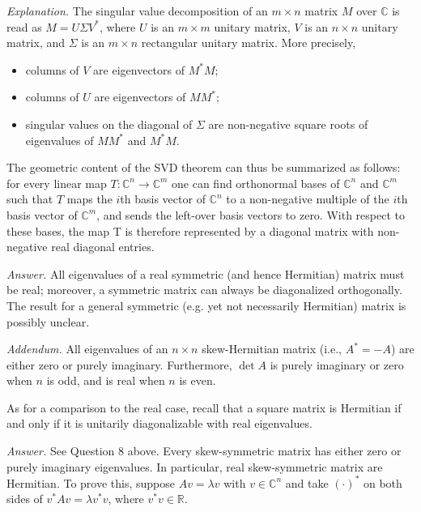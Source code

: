 \documentclass{mathproblems}
\newcommand\R{\mathbb{R}}
\newcommand\C{\mathbb{C}}
\begin{document}
\begin{questions}

\textit{Explanation.} The singular value decomposition of an $m\times n$ matrix $M$ over $\C$ is read as $M=U\Sigma V^*$, where $U$ is an $m\times m$ unitary matrix, $V$ is an $n\times n$ unitary matrix, and $\Sigma$ is an $m\times n$ rectangular unitary matrix. More precisely, \vspace{-6pt}
\begin{itemize}
\item columns of $V$ are eigenvectors of $M^*M$; \vspace{-4pt}
\item columns of $U$ are eigenvectors of $MM^*$; \vspace{-4pt}
\item singular values on the diagonal of $\Sigma$ are non-negative square roots of eigenvalues of $MM^*$ and $M^*M$.
\end{itemize} \vspace{-6pt}
The geometric content of the SVD theorem can thus be summarized as follows: for every linear map $T:\C^n \to \C^m$ one can find orthonormal bases of $\C^n$ and $\C^m$ such that $T$ maps the $i$th basis vector of $\C^n$ to a non-negative multiple of the $i$th basis vector of $\C^m$, and sends the left-over basis vectors to zero. With respect to these bases, the map T is therefore represented by a diagonal matrix with non-negative real diagonal entries.



\textit{Answer.}
All eigenvalues of a real symmetric (and hence Hermitian) matrix  must be real; moreover, a symmetric matrix can always be diagonalized orthogonally. The result for a general symmetric (e.g. yet not necessarily Hermitian) matrix is possibly unclear. 

\textit{Addendum.} All eigenvalues of an $n\times n$ skew-Hermitian matrix (i.e., $A^*=-A$) are either zero or purely imaginary. Furthermore, $\det A$ is purely imaginary or zero when $n$ is odd, and is real when $n$ is even.

As for a comparison to the real case, recall that a square matrix is Hermitian if and only if it is unitarily diagonalizable with real eigenvalues. 


\textit{Answer.} See Question 8 above. Every skew-symmetric matrix has either zero or purely imaginary eigenvalues. In particular, real skew-symmetric matrix are Hermitian. To prove this, suppose $Av=\lambda v$ with $v\in \C^n$ and take $(\cdot)^*$ on both sides of $v^* Av=\lambda v^*v$, where $v^*v\in \R$.



\end{questions}
\end{document}
